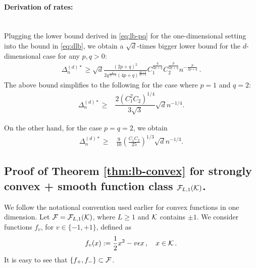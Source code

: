 \paragraph{Derivation of rates:}\ \\
Plugging the lower bound derived in \eqref{eq:lb-pq} for the one-dimensional setting into the bound in \eqref{eq:dlb}, we obtain a $\sqrt{d}$-times bigger lower bound for the $d$-dimensional case for any $p, q >0$:
\begin{align}
\Delta_n^{(d)*} \ge  \sqrt{d} \frac{\left(2p+q\right)^2}{2q^{\frac{q}{2p+q}}\left(4p+q\right)^{\frac{4p+q}{2p+q}}}C_1^{\frac{q}{2p+q}} C_2^{\frac{p}{2p+q}}  n^{-\tfrac{p}{2p+q}} \,.
\label{eq:lb-pq-1}
\end{align}
The above bound simplifies to the following for the case where $p=1$ and $q=2$:
\begin{align*}
\Delta_n^{(d)*}  \ge& \dfrac{ 2(C_1^2C_2)^{1/4}}{3\sqrt{3}} \sqrt{d}n^{-1/4}.
\end{align*}

On the other hand, for the case $p=q=2$, we obtain
\begin{align*}
\Delta_n^{(d)*}  \ge& \frac{9}{10}\left(\frac{C_1 C_2}{25}\right)^{1/3} \sqrt{d}n^{-1/3}.
\end{align*}

\subsection{Proof of Theorem \ref{thm:lb-convex} for strongly convex + smooth function class $\mathcal{F}_{L,1}(\mathcal{K})$.}
\label{sec:appendix-lbscconvex}
We follow the notational convention used earlier for convex functions in one dimension. 
Let $\mathcal{F} = \mathcal{F}_{L,1}(\mathcal{K})$, where $L\ge 1$ and $\mathcal{K}$  contains $\pm 1$.
We consider functions $f_v$, for $v \in \{-1,+1\}$, defined as
\begin{align}
  f_v(x) := \dfrac{1}{2} x^2 - v\epsilon x \,,\quad x \in \mathcal{K}\,.
  \label{eq:socfdef}
\end{align}
It is easy to see that $\{f_+, f_-\}\subset \mathcal{F}$.

